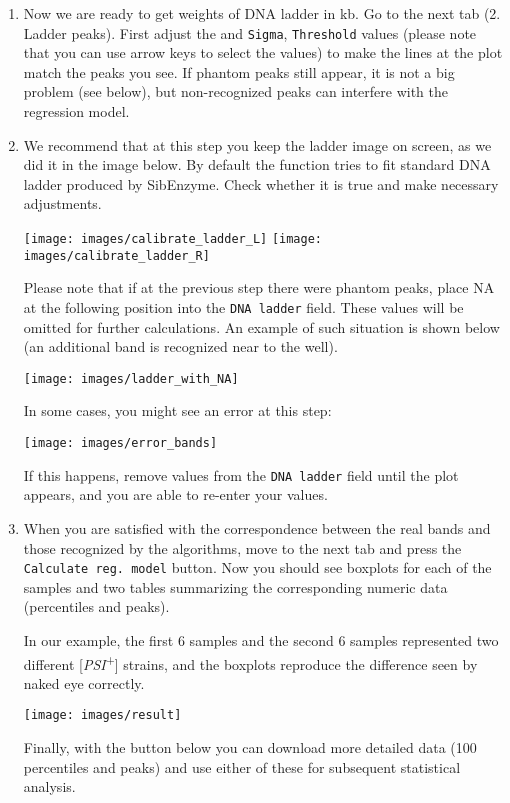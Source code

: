\documentclass[11pt]{article}
\begin{document}
\begin{enumerate}
\item Now we are ready to get weights of DNA ladder in kb. Go to the next tab (2. Ladder peaks). First adjust the and \texttt{Sigma}, \texttt{Threshold} values (please note that you can use arrow keys to select the values) to make the lines at the plot match the peaks you see. If phantom peaks still appear, it is not a big problem (see below), but non-recognized peaks can interfere with the regression model.

\item We recommend that at this step you keep the ladder image on screen, as we did it in the image below. By default the function tries to fit standard DNA ladder produced by SibEnzyme. Check whether it is true and make necessary adjustments.

\texttt{[image: images/calibrate\_ladder\_L]}
\texttt{[image: images/calibrate\_ladder\_R]}


Please note that if at the previous step there were phantom peaks, place NA at the following position into the \texttt{DNA ladder} field. These values will be omitted for further calculations. An example of such situation is shown below (an additional band is recognized near to the well). 

\texttt{[image: images/ladder\_with\_NA]}

In some cases, you might see an error at this step:

\texttt{[image: images/error\_bands]}

If this happens, remove values from the \texttt{DNA ladder} field until the plot appears, and you are able to re-enter your values.  

\item When you are satisfied with the correspondence between the real bands and those recognized by the algorithms, move to the next tab and press the \texttt{Calculate reg.~model} button. 
Now you should see boxplots for each of the samples and two tables summarizing the corresponding numeric data (percentiles and peaks).  


In our example, the first 6 samples and the second 6 samples represented two different [\textit{PSI}\textsuperscript{+}] strains, and the boxplots reproduce the difference seen by naked eye correctly. 


\texttt{[image: images/result]}


Finally, with the button below you can download more detailed data (100 percentiles and peaks) and use either of these for subsequent statistical analysis. 


\end{enumerate}
\end{document}

